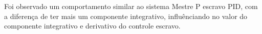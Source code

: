 Foi observado um comportamento similar ao sistema Mestre P escravo PID, com a diferença de ter mais um componente
integrativo, influênciando no valor do componente integrativo e derivativo do controle escravo.